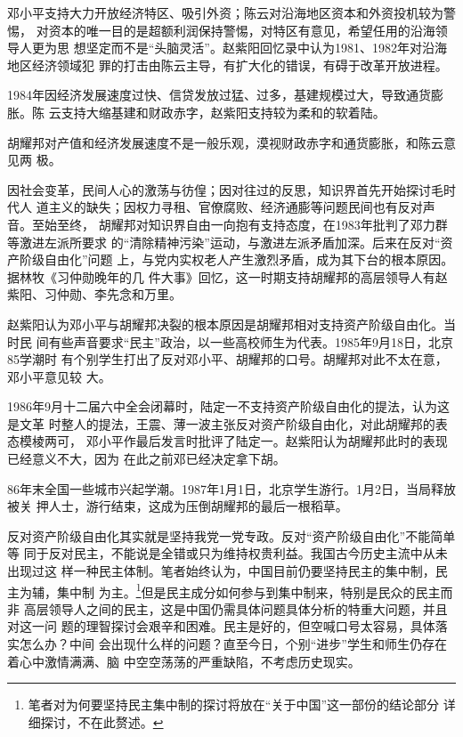 邓小平支持大力开放经济特区、吸引外资；陈云对沿海地区资本和外资投机较为警惕，
对资本的唯一目的是超额利润保持警惕，对特区有意见，希望任用的沿海领导人更为思
想坚定而不是“头脑灵活”。赵紫阳回忆录中认为1981、1982年对沿海地区经济领域犯
罪的打击由陈云主导，有扩大化的错误，有碍于改革开放进程。

1984年因经济发展速度过快、信贷发放过猛、过多，基建规模过大，导致通货膨胀。陈
云支持大缩基建和财政赤字，赵紫阳支持较为柔和的软着陆。


胡耀邦对产值和经济发展速度不是一般乐观，漠视财政赤字和通货膨胀，和陈云意见两
极。

因社会变革，民间人心的激荡与彷偟；因对往过的反思，知识界首先开始探讨毛时代人
道主义的缺失；因权力寻租、官僚腐败、经济通膨等问题民间也有反对声音。至始至终，
胡耀邦对知识界自由一向抱有支持态度，在1983年批判了邓力群等激进左派所要求
的“清除精神污染”运动，与激进左派矛盾加深。后来在反对“资产阶级自由化”问题
上，与党内实权老人产生激烈矛盾，成为其下台的根本原因。据林牧《习仲勋晚年的几
件大事》回忆，这一时期支持胡耀邦的高层领导人有赵紫阳、习仲勋、李先念和万里。

赵紫阳认为邓小平与胡耀邦决裂的根本原因是胡耀邦相对支持资产阶级自由化。当时民
间有些声音要求“民主”政治，以一些高校师生为代表。1985年9月18日，北京85学潮时
有个别学生打出了反对邓小平、胡耀邦的口号。胡耀邦对此不太在意，邓小平意见较
大。

1986年9月十二届六中全会闭幕时，陆定一不支持资产阶级自由化的提法，认为这是文革
时整人的提法，王震、薄一波主张反对资产阶级自由化，对此胡耀邦的表态模棱两可，
邓小平作最后发言时批评了陆定一。赵紫阳认为胡耀邦此时的表现已经意义不大，因为
在此之前邓已经决定拿下胡。

86年末全国一些城市兴起学潮。1987年1月1日，北京学生游行。1月2日，当局释放被关
押人士，游行结束，这成为压倒胡耀邦的最后一根稻草。

反对资产阶级自由化其实就是坚持我党一党专政。反对“资产阶级自由化”不能简单等
同于反对民主，不能说是全错或只为维持权贵利益。我国古今历史主流中从未出现过这
样一种民主体制。笔者始终认为，中国目前仍要坚持民主的集中制，民主为辅，集中制
为主。\footnote{笔者对为何要坚持民主集中制的探讨将放在“关于中国”这一部份的结论部分
  详细探讨，不在此赘述。}但是民主成分如何参与到集中制来，特别是民众的民主而非
高层领导人之间的民主，这是中国仍需具体问题具体分析的特重大问题，并且对这一问
题的理智探讨会艰辛和困难。民主是好的，但空喊口号太容易，具体落实怎么办？中间
会出现什么样的问题？直至今日，个别“进步”学生和师生仍存在着心中激情满满、脑
中空空荡荡的严重缺陷，不考虑历史现实。

